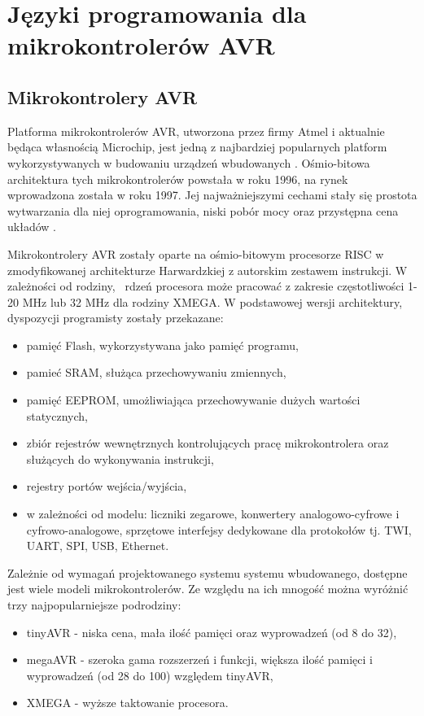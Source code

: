 \chapter{Języki programowania dla mikrokontrolerów AVR}
\label{ch:02}


\section{Mikrokontrolery AVR}
Platforma mikrokontrolerów AVR, utworzona przez firmy Atmel i aktualnie będąca własnością Microchip, jest jedną z najbardziej popularnych platform wykorzystywanych w budowaniu urządzeń wbudowanych . Ośmio-bitowa  architektura tych mikrokontrolerów powstała w roku 1996, na rynek wprowadzona została w roku 1997. Jej najważniejszymi cechami stały się prostota wytwarzania dla niej oprogramowania, niski pobór mocy oraz przystępna cena układów .

Mikrokontrolery AVR zostały oparte na ośmio-bitowym  procesorze RISC w zmodyfikowanej architekturze Harwardzkiej  z autorskim zestawem instrukcji. W zależności od rodziny, \nocomma\ rdzeń procesora może pracować z zakresie częstotliwości 1-20 MHz lub 32 MHz dla rodziny XMEGA.
W podstawowej wersji architektury, dyspozycji programisty zostały przekazane:
\begin{itemize}
\item pamięć Flash, wykorzystywana jako pamięć programu,
\item pamieć SRAM, służąca przechowywaniu zmiennych,
\item pamięć EEPROM, umożliwiająca przechowywanie dużych wartości statycznych,
\item zbiór rejestrów wewnętrznych kontrolujących pracę mikrokontrolera oraz służących do wykonywania instrukcji,
\item rejestry portów wejścia/wyjścia,
\item w zależności od modelu: liczniki zegarowe, konwertery analogowo-cyfrowe i cyfrowo-analogowe, sprzętowe interfejsy dedykowane dla protokołów tj. TWI, UART, SPI, USB, Ethernet.
\end{itemize}

Zależnie od wymagań projektowanego systemu systemu wbudowanego, dostępne jest wiele modeli mikrokontrolerów. Ze względu na ich mnogość można wyróżnić trzy najpopularniejsze podrodziny:
\begin{itemize}
\item tinyAVR - \ksremark{--} niska cena, mała ilość pamięci oraz wyprowadzeń (od 8 do 32),
\item megaAVR - szeroka gama rozszerzeń i funkcji, większa ilość pamięci i wyprowadzeń (od 28 do 100) względem tinyAVR,
\item XMEGA - wyższe taktowanie procesora.
\end{itemize}

